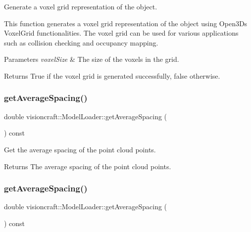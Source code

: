 Generate a voxel grid representation of the object. 

This function generates a voxel grid representation of the object using Open3D\textquotesingle{}s Voxel\+Grid functionalities. The voxel grid can be used for various applications such as collision checking and occupancy mapping.


\begin{DoxyParams}{Parameters}
{\em voxel\+Size} & The size of the voxels in the grid. \\
\hline
\end{DoxyParams}
\begin{DoxyReturn}{Returns}
True if the voxel grid is generated successfully, false otherwise. 
\end{DoxyReturn}
\mbox{\label{classvisioncraft_1_1ModelLoader_ab74391644bf2539d37c072f4bb651254}} 
\subsubsection{\texorpdfstring{get\+Average\+Spacing()}{getAverageSpacing()}\hspace{0.1cm}{\footnotesize\ttfamily [1/2]}}
{\footnotesize\ttfamily double visioncraft\+::\+Model\+Loader\+::get\+Average\+Spacing (\begin{DoxyParamCaption}{ }\end{DoxyParamCaption}) const\hspace{0.3cm}{\ttfamily [inline]}}



Get the average spacing of the point cloud points. 

\begin{DoxyReturn}{Returns}
The average spacing of the point cloud points. 
\end{DoxyReturn}
\mbox{\label{classvisioncraft_1_1ModelLoader_ab74391644bf2539d37c072f4bb651254}} 
\subsubsection{\texorpdfstring{get\+Average\+Spacing()}{getAverageSpacing()}\hspace{0.1cm}{\footnotesize\ttfamily [2/2]}}
{\footnotesize\ttfamily double visioncraft\+::\+Model\+Loader\+::get\+Average\+Spacing (\begin{DoxyParamCaption}{ }\end{DoxyParamCaption}) const\hspace{0.3cm}{\ttfamily [inline]}}



